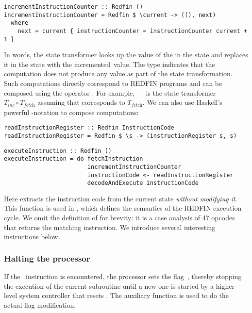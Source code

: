\begin{verbatim}
incrementInstructionCounter :: Redfin ()
incrementInstructionCounter = Redfin $ \current -> ((), next)
  where
    next = current { instructionCounter = instructionCounter current + 1 }
\end{verbatim}


\noindent
In words, the state transformer looks up the value of the 
in the  state and replaces it in the  state with the
incremented~value. The type  indicates that the computation does not
produce any value as part of the state transformation. Such computations directly
correspond to REDFIN programs and can be composed using the operator \hs{>>}.
For example, ~\hs{>>}~ is
the state transformer $T_\textit{inc} \circ T_\textit{fetch}$ assuming that
 corresponds to $T_\textit{fetch}$. We can also use
Haskell's powerful -notation to compose computations:


\begin{verbatim}
readInstructionRegister :: Redfin InstructionCode
readInstructionRegister = Redfin $ \s -> (instructionRegister s, s)
\end{verbatim}

\begin{verbatim}
executeInstruction :: Redfin ()
executeInstruction = do fetchInstruction
                        incrementInstructionCounter
                        instructionCode <- readInstructionRegister
                        decodeAndExecute instructionCode
\end{verbatim}

\noindent
Here  extracts the instruction code from the current
state \emph{without modifying it}. This function is used in ,
which defines the semantics of the REDFIN execution cycle. We omit the definition of
 for brevity: it is a case analysis of 47 opcodes that returns
the matching instruction. We introduce several interesting instructions below.


\subsubsection{Halting the processor}
If the~ instruction is encountered, the processor sets the flag~,
thereby stopping the execution of the current subroutine until a new one is
started by a higher-level system controller that resets . The auxiliary
function  is used to do the actual flag modification.


